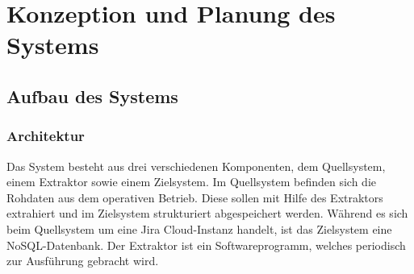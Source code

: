\section{Konzeption und Planung des Systems}
\subsection{Aufbau des Systems}
\subsubsection{Architektur}
Das System besteht aus drei verschiedenen Komponenten, dem Quellsystem, einem Extraktor sowie einem Zielsystem. Im Quellsystem befinden sich die Rohdaten aus dem operativen Betrieb. Diese sollen mit Hilfe des Extraktors extrahiert und im Zielsystem strukturiert abgespeichert werden. Während es sich beim Quellsystem um eine Jira Cloud-Instanz handelt, ist das Zielsystem eine NoSQL-Datenbank. Der Extraktor ist ein Softwareprogramm, welches periodisch zur Ausführung gebracht wird.
